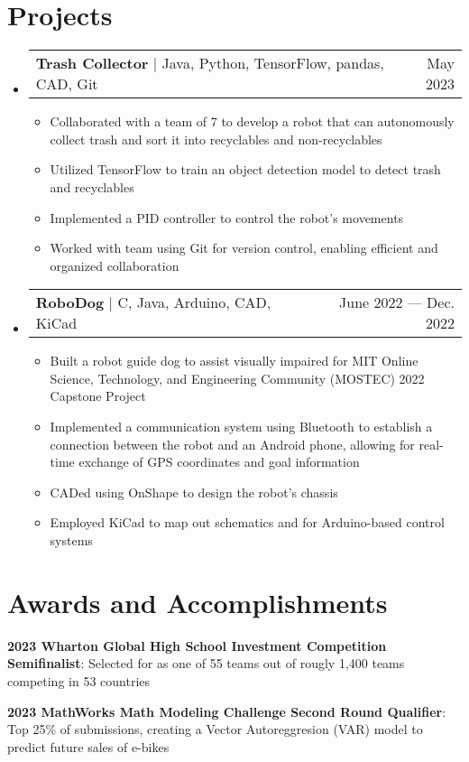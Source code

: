 \documentclass[letterpaper,11pt]{article}
\makeatletter
\newcommand{\resumeItem}[1]{
  \item\small{
    {#1 \vspace{-2pt}}
  }
}
\newcommand{\resumeProjectHeading}[2]{
    \item
    \begin{tabular*}{0.97\textwidth}{l@{\extracolsep{\fill}}r}
      \small#1 & #2 \\
    \end{tabular*}\vspace{-7pt}
}
\newcommand{\resumeSubHeadingListStart}{\begin{itemize}[leftmargin=0.15in, label={}]}
\newcommand{\resumeSubHeadingListEnd}{\end{itemize}}
\newcommand{\resumeItemListStart}{\begin{itemize}}
\newcommand{\resumeItemListEnd}{\end{itemize}\vspace{-5pt}}
\makeatother
\begin{document}
\section{Projects}
    \resumeSubHeadingListStart
    \resumeProjectHeading
    {\textbf{Trash Collector} $|$ {Java, Python, TensorFlow, pandas, CAD, Git}}{May 2023}
    \resumeItemListStart
      \resumeItem{Collaborated with a team of 7 to develop a robot that can autonomously collect trash and sort it into recyclables and non-recyclables}
      \resumeItem{Utilized TensorFlow to train an object detection model to detect trash and recyclables}
      \resumeItem{Implemented a PID controller to control the robot's movements}
      \resumeItem{Worked with team using Git for version control, enabling efficient and organized collaboration}
    \resumeItemListEnd
      \resumeProjectHeading
          {\textbf{RoboDog} $|$ {C, Java, Arduino, CAD, KiCad}}{June 2022 --- Dec. 2022}
          \resumeItemListStart
            \resumeItem{Built a robot guide dog to assist visually impaired for MIT Online Science, Technology, and Engineering Community (MOSTEC) 2022 Capstone Project}
            \resumeItem{Implemented a communication system using Bluetooth to establish a connection between the robot and an Android phone, allowing for real-time exchange of GPS coordinates and goal information}
            \resumeItem{CADed using OnShape to design the robot's chassis}
            \resumeItem{Employed KiCad to map out schematics and for Arduino-based control systems}
          \resumeItemListEnd
    \resumeSubHeadingListEnd

\section{Awards and Accomplishments}
    \begin{itemize}[leftmargin=0.15in]
        \small{
            \item{\textbf{2023 Wharton Global High School Investment Competition Semifinalist}{: Selected for as one of 55 teams out of rougly 1,400 teams competing in 53 countries}}
            \item {\textbf{2023 MathWorks Math Modeling Challenge Second Round Qualifier}{: Top 25\% of submissions, creating a Vector Autoreggresion (VAR) model to predict future sales of e-bikes}}
        }
 \end{itemize}



\end{document}
